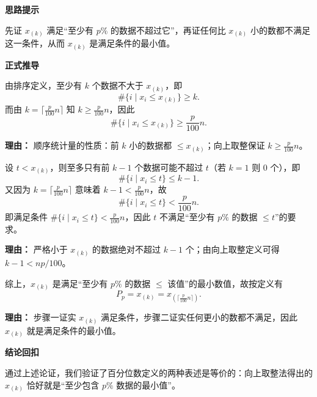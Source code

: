 \begin{proofbox}

	\textbf{\textcolor{CProof}{思路提示}}

	先证 $x_{(k)}$ 满足“至少有 $p\text{\%}$ 的数据不超过它”，再证任何比 $x_{(k)}$ 小的数都不满足这一条件，从而 $x_{(k)}$ 是满足条件的最小值。

	\medskip
	\textbf{\textcolor{CProof}{正式推导}}
	\begin{description}[style=nextline, leftmargin=2.8em, labelsep=0.5em, itemsep=0.55em]
		\item[\textbf{步骤一（满足性证明）：}] 由排序定义，至少有 $k$ 个数据不大于 $x_{(k)}$，即
			\[
				\#\{i\mid x_i\le x_{(k)}\} \ge k.
			\]
			而由 $k = \lceil \frac{p}{100}n\rceil$ 知 $k \ge \frac{p}{100}n$，因此
			\[
				\#\{i\mid x_i\le x_{(k)}\} \ge \frac{p}{100}n.
			\]
			\par\textbf{理由：} 顺序统计量的性质：前 $k$ 小的数据都 $\le x_{(k)}$；向上取整保证 $k\ge \frac{p}{100}n$。

		\item[\textbf{步骤二（最小性证明）：}] 设 $t < x_{(k)}$，则至多只有前 $k-1$ 个数据可能不超过 $t$（若 $k=1$ 则 $0$ 个），即
			\[
				\#\{i\mid x_i\le t\} \le k-1.
			\]
			又因为 $k = \lceil \frac{p}{100}n\rceil$ 意味着 $k-1 < \frac{p}{100}n$，故
			\[
				\#\{i\mid x_i\le t\} < \frac{p}{100}n.
			\]
			即满足条件 $ \#\{i\mid x_i\le t\} < \frac{p}{100}n$，因此 $t$ 不满足“至少有 $p\text{\%}$ 的数据 $\le t$”的要求。
			\par\textbf{理由：} 严格小于 $x_{(k)}$ 的数据绝对不超过 $k-1$ 个；由向上取整定义可得 $k-1 < np/100$。

		\item[\textbf{步骤三（综合结论）：}] 综上，$x_{(k)}$ 是满足“至少有 $p\text{\%}$ 的数据 $\le $ 该值”的最小数值，故按定义有
			\[
				P_p = x_{(k)} = x_{(\lceil \frac{p}{100}n\rceil)}.
			\]
			\par\textbf{理由：} 步骤一证实 $x_{(k)}$ 满足条件，步骤二证实任何更小的数都不满足，因此 $x_{(k)}$ 就是满足条件的最小值。
	\end{description}

	\medskip
	\textbf{\textcolor{CProof}{结论回扣}}

	通过上述论证，我们验证了百分位数定义的两种表述是等价的：向上取整法得出的 $x_{(k)}$ 恰好就是“至少包含 $p\text{\%}$ 数据的最小值”。
\end{proofbox}
